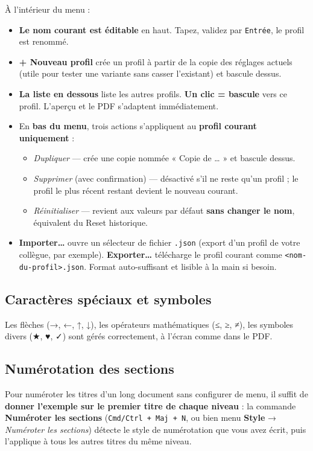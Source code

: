 \documentclass[11pt,a4paper]{article}
\theoremstyle{definition}
\begin{document}
À l'intérieur du menu :


\begin{itemize}
  \item \textbf{Le nom courant est éditable} en haut. Tapez, validez par
\texttt{Entrée}, le profil est renommé.
  \item \textbf{+ Nouveau profil} crée un profil à partir de la copie des
réglages actuels (utile pour tester une variante sans casser
l'existant) et bascule dessus.
  \item \textbf{La liste en dessous} liste les autres profils. \textbf{Un clic =
bascule} vers ce profil. L'aperçu et le PDF s'adaptent
immédiatement.
  \item En \textbf{bas du menu}, trois actions s'appliquent au \textbf{profil courant
uniquement} :

\begin{itemize}
  \item \emph{Dupliquer} — crée une copie nommée « Copie de … » et bascule
dessus.
  \item \emph{Supprimer} (avec confirmation) — désactivé s'il ne reste qu'un
profil ; le profil le plus récent restant devient le nouveau
courant.
  \item \emph{Réinitialiser} — revient aux valeurs par défaut \textbf{sans changer
le nom}, équivalent du Reset historique.
\end{itemize}
  \item \textbf{Importer…} ouvre un sélecteur de fichier \texttt{.json} (export d'un
profil de votre collègue, par exemple). \textbf{Exporter…} télécharge
le profil courant comme \texttt{<nom-du-profil>.json}. Format auto-suffisant
et lisible à la main si besoin.
\end{itemize}


\subsection{Caractères spéciaux et symboles}

Les flèches (→, ←, ↑, ↓), les opérateurs mathématiques (≤, ≥, ≠), les
symboles divers (★, ♥, ✓) sont gérés correctement, à l'écran comme
dans le PDF.


\subsection{Numérotation des sections}

Pour numéroter les titres d'un long document sans configurer de menu,
il suffit de \textbf{donner l'exemple sur le premier titre de chaque
niveau} : la commande \textbf{Numéroter les sections}
(\texttt{Cmd/Ctrl + Maj + N}, ou bien menu \textbf{Style} → \emph{Numéroter les
sections}) détecte le style de numérotation que vous avez écrit, puis
l'applique à tous les autres titres du même niveau.
\end{document}

